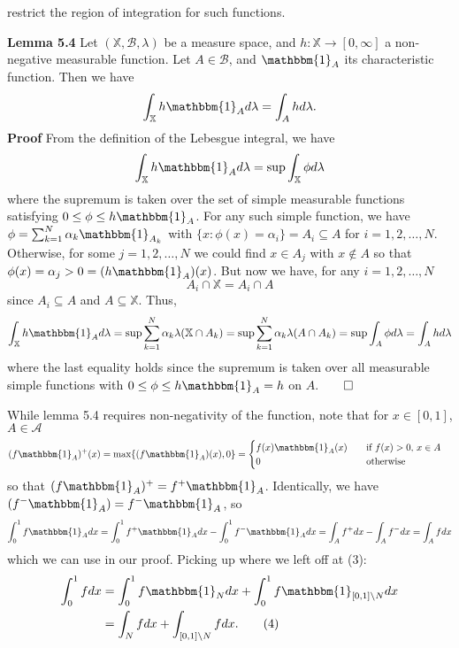 \documentclass[11pt, letterpaper]{article}
\newcommand{\mbb}[1]{\mathbb{#1}}
\newcommand{\bbm}[1]{\mathbbm{#1}}
\newcommand{\mc}[1]{\mathcal{#1}}
\begin{document}
    restrict the region of integration for such functions.
    \begin{center}
        \begin{minipage}[c]{0.85\linewidth}
            {\bf Lemma 5.4} Let $(\mbb{X},\mc{B},\lambda)$ be a measure space, and $h:\mbb{X}\rightarrow[0,\infty]$ a non-negative measurable function. Let $A\in\mc{B}$, and $\bbm{1}_A$ its characteristic function.
            Then we have
            \[\int_\mbb{X}h\bbm{1}_Ad\lambda=\int_Ahd\lambda.\]
            {\bf Proof} From the definition of the Lebesgue integral, we have
            \[\int_\mbb{X}h\bbm{1}_Ad\lambda=\sup\int_\mbb{X}\phi d\lambda\]
            where the supremum is taken over the set of simple measurable functions satisfying $0\leq \phi\leq h\bbm{1}_A$. For any such simple function, we have $\phi=\sum_{k=1}^N\alpha_k\bbm{1}_{A_k}$
            with $\{x:\phi(x)=\alpha_i\}=A_i\subseteq A$ for $i=1,2,\dots, N$. Otherwise, for some $j=1,2,\dots,N$ we could find $x\in A_j$ with $x\notin A$ so that $\phi(x)=\alpha_j>0=(h\bbm{1}_A)(x)$.
            But now we have, for any $i=1,2,\dots,N$
            \[A_i\cap\mbb{X}=A_i\cap A\]
            since $A_i\subseteq A$ and $A\subseteq \mbb{X}$. Thus,
            \[\int_{\mbb{X}}h\bbm{1}_Ad\lambda=\sup\sum_{k=1}^N\alpha_k\lambda(\mbb{X}\cap A_k)=\sup\sum_{k=1}^N\alpha_k\lambda(A\cap A_k)=\sup\int_A\phi d\lambda=\int_A hd\lambda\]
            where the last equality holds since the supremum is taken over all measurable simple functions with $0\leq \phi\leq h\bbm{1}_A=h$ on $A$.\hfill{$\qed$}
        \end{minipage}
    \end{center}\vspace{10pt}
    While lemma 5.4 requires non-negativity of the function, note that for $x\in[0,1]$, $A\in\mc{A}$
    \begin{align*}
        (f\bbm{1}_A)^+(x)=\max\{(f\bbm{1}_A)(x),0\}&=\begin{cases}
            f(x)\bbm{1}_A(x)\quad&\text{if $f(x)> 0$, $x\in A$}\\
            0\quad&\text{otherwise}
        \end{cases}
    \end{align*}
    so that $(f\bbm{1}_A)^+=f^+\bbm{1}_A$. Identically, we have $(f^-\bbm{1}_A)=f^-\bbm{1}_A$, so
    \[\int_0^1f\bbm{1}_Adx=\int_0^1f^+\bbm{1}_Adx-\int_0^1f^-\bbm{1}_Adx=\int_Af^+dx-\int_Af^-dx=\int_Afdx\]
    which we can use in our proof. Picking up where we left off at (3):
    \begin{align*}
        \int_0^1fdx&=\int_0^1f\bbm{1}_Ndx+\int_0^1f\bbm{1}_{[0,1]\setminus N}dx\\
        &=\int_Nfdx+\int_{[0,1]\setminus N}fdx.\tag{4}
    \end{align*}
\end{document}
